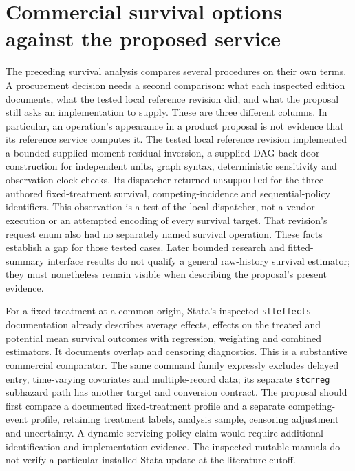 \section{Commercial survival options against the proposed service}
\label{exec16:commercial-matrix}

The preceding survival analysis compares several procedures on their own
terms. A procurement decision needs a second comparison: what each inspected
edition documents, what the tested local reference revision did, and what
the proposal still asks an implementation to supply. These are three different
columns. In particular, an operation's appearance in a product proposal is
not evidence that its reference service computes it. The tested local
reference revision implemented a bounded supplied-moment residual inversion,
a supplied DAG back-door construction for independent units, graph syntax,
deterministic sensitivity and observation-clock checks. Its dispatcher returned
\texttt{unsupported} for the three authored fixed-treatment survival,
competing-incidence and sequential-policy identifiers. This observation is a
test of the local dispatcher, not a vendor execution or an attempted encoding
of every survival target. That revision's request enum also had no separately
named survival operation. These facts establish a gap for those tested cases.
Later bounded research and fitted-summary interface results do not qualify a
general raw-history survival estimator; they must nonetheless remain visible
when describing the proposal's present evidence.
\citep{exec16_commercial_runtime}

For a fixed treatment at a common origin, Stata's inspected
\texttt{stteffects} documentation already describes average effects, effects
on the treated and potential mean survival outcomes with regression,
weighting and combined estimators. It documents overlap and censoring
diagnostics. This is a substantive commercial comparator. The same command
family expressly excludes delayed entry, time-varying covariates and
multiple-record data; its separate \texttt{stcrreg} subhazard path has another
target and conversion contract. The proposal should first compare a
documented fixed-treatment profile and a separate competing-event profile,
retaining treatment labels, analysis sample, censoring adjustment and
uncertainty. A dynamic servicing-policy claim would require additional
identification and implementation evidence. The inspected mutable manuals
do not verify a particular installed Stata update at the literature cutoff.
\citep{exec14_survival_stata,exec14_survival_stata_competing}

